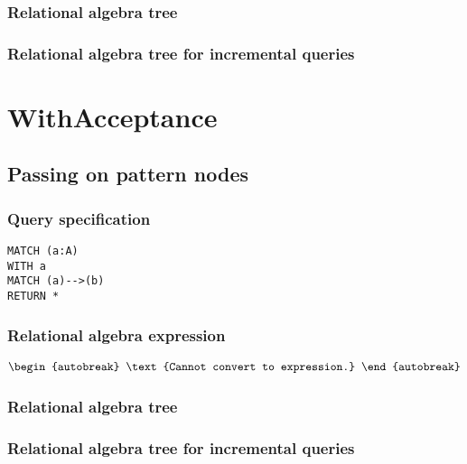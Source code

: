 \subsubsection*{Relational algebra tree}


\subsubsection*{Relational algebra tree for incremental queries}

\section{WithAcceptance}


\subsection{Passing on pattern nodes}

\subsubsection*{Query specification}

\begin{lstlisting}
MATCH (a:A)
WITH a
MATCH (a)-->(b)
RETURN *
\end{lstlisting}

\subsubsection*{Relational algebra expression}

\begin{align*}
\begin{autobreak}
\text{Cannot convert to expression.}
\end{autobreak}
\end{align*}

\subsubsection*{Relational algebra tree}


\subsubsection*{Relational algebra tree for incremental queries}

